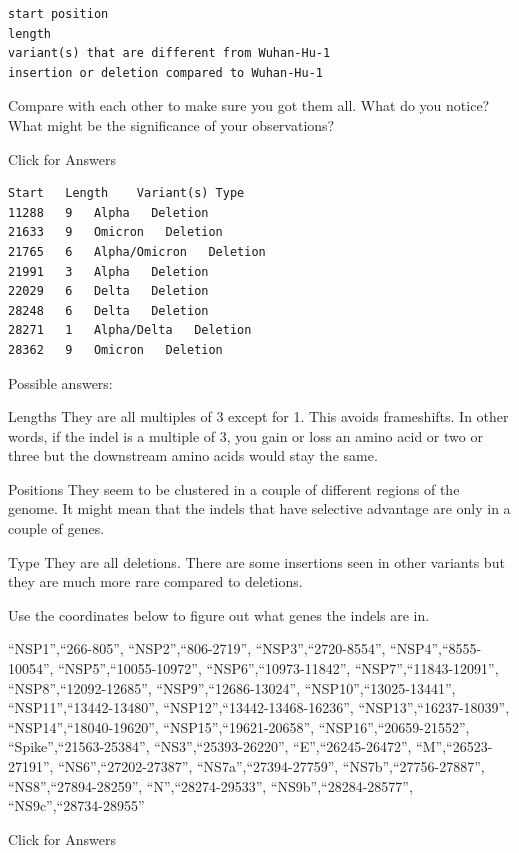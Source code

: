 \documentclass[
]{book}
\begin{document}
\begin{verbatim}
start position
length
variant(s) that are different from Wuhan-Hu-1
insertion or deletion compared to Wuhan-Hu-1
\end{verbatim}

Compare with each other to make sure you got them all. What do you notice? What might be the significance of your observations?

Click for Answers

\begin{verbatim}
Start   Length    Variant(s) Type
11288   9   Alpha   Deletion
21633   9   Omicron   Deletion
21765   6   Alpha/Omicron   Deletion
21991   3   Alpha   Deletion
22029   6   Delta   Deletion
28248   6   Delta   Deletion
28271   1   Alpha/Delta   Deletion
28362   9   Omicron   Deletion
\end{verbatim}

Possible answers:

Lengths
They are all multiples of 3 except for 1. This avoids frameshifts. In other words, if the indel is a multiple of 3, you gain or loss an amino acid or two or three but the downstream amino acids would stay the same.

Positions
They seem to be clustered in a couple of different regions of the genome. It might mean that the indels that have selective advantage are only in a couple of genes.

Type
They are all deletions. There are some insertions seen in other variants but they are much more rare compared to deletions.

\hfill\break

Use the coordinates below to figure out what genes the indels are in.

``NSP1'',``266-805'',
``NSP2'',``806-2719'',
``NSP3'',``2720-8554'',
``NSP4'',``8555-10054'',
``NSP5'',``10055-10972'',
``NSP6'',``10973-11842'',
``NSP7'',``11843-12091'',
``NSP8'',``12092-12685'',
``NSP9'',``12686-13024'',
``NSP10'',``13025-13441'',
``NSP11'',``13442-13480'',
``NSP12'',``13442-13468-16236'',
``NSP13'',``16237-18039'',
``NSP14'',``18040-19620'',
``NSP15'',``19621-20658'',
``NSP16'',``20659-21552'',
``Spike'',``21563-25384'',
``NS3'',``25393-26220'',
``E'',``26245-26472'',
``M'',``26523-27191'',
``NS6'',``27202-27387'',
``NS7a'',``27394-27759'',
``NS7b'',``27756-27887'',
``NS8'',``27894-28259'',
``N'',``28274-29533'',
``NS9b'',``28284-28577'',
``NS9c'',``28734-28955''

Click for Answers
\end{document}
